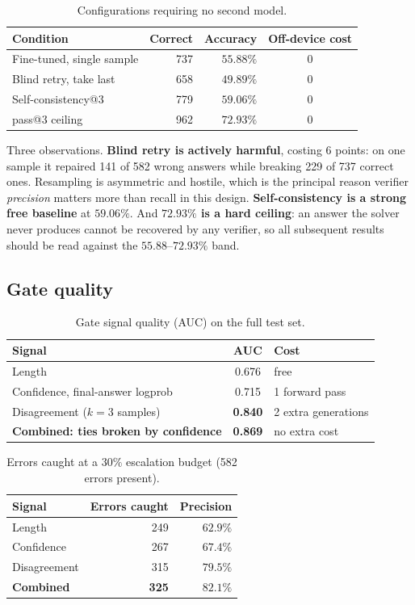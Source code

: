 \documentclass[conference]{IEEEtran}
\begin{document}
\begin{table}[t]
\caption{Configurations requiring no second model.}
\label{tab:free}
\centering
\small
\begin{tabular}{@{}lrrc@{}}
\toprule
Condition & Correct & Accuracy & Off-device cost \\
\midrule
Fine-tuned, single sample & 737 & $55.88\%$ & 0 \\
Blind retry, take last & 658 & $\mathbf{49.89\%}$ & 0 \\
Self-consistency@3 & 779 & $\mathbf{59.06\%}$ & 0 \\
pass@3 ceiling & 962 & $\mathbf{72.93\%}$ & 0 \\
\bottomrule
\end{tabular}
\end{table}

Three observations. \textbf{Blind retry is actively harmful}, costing 6 points: on one
sample it repaired 141 of 582 wrong answers while breaking 229 of 737 correct ones.
Resampling is asymmetric and hostile, which is the principal reason verifier
\emph{precision} matters more than recall in this design. \textbf{Self-consistency is a
strong free baseline} at $59.06\%$. And \textbf{$72.93\%$ is a hard ceiling}: an answer the
solver never produces cannot be recovered by any verifier, so all subsequent results should
be read against the $55.88$--$72.93\%$ band.

\subsection{Gate quality}

\begin{table}[t]
\caption{Gate signal quality (AUC) on the full test set.}
\label{tab:auc}
\centering
\small
\begin{tabular}{@{}lcl@{}}
\toprule
Signal & AUC & Cost \\
\midrule
Length & 0.676 & free \\
Confidence, final-answer logprob & 0.715 & 1 forward pass \\
Disagreement ($k=3$ samples) & \textbf{0.840} & 2 extra generations \\
\textbf{Combined: ties broken by confidence} & \textbf{0.869} & no extra cost \\
\bottomrule
\end{tabular}
\end{table}

\begin{table}[t]
\caption{Errors caught at a $30\%$ escalation budget (582 errors present).}
\label{tab:caught}
\centering
\small
\begin{tabular}{@{}lrr@{}}
\toprule
Signal & Errors caught & Precision \\
\midrule
Length & 249 & $62.9\%$ \\
Confidence & 267 & $67.4\%$ \\
Disagreement & 315 & $79.5\%$ \\
\textbf{Combined} & \textbf{325} & $\mathbf{82.1\%}$ \\
\bottomrule
\end{tabular}
\end{table}
\end{document}
